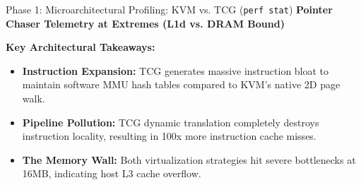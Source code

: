 \documentclass[aspectratio=169]{beamer} %
\begin{document}
    \begin{frame}{Phase 1: Microarchitectural Profiling: KVM vs. TCG (\texttt{perf stat})}
      \textbf{Pointer Chaser Telemetry at Extremes (L1d vs. DRAM Bound)}
      \vspace{0.2cm}
      
      \begin{table}[]
          \centering
          \renewcommand{\arraystretch}{1.3} %
      \end{table}

      \vspace{0.3cm}
      \textbf{Key Architectural Takeaways:}
      \begin{itemize}
          \item \textbf{Instruction Expansion:} TCG generates massive instruction bloat to maintain software MMU hash tables compared to KVM's native 2D page walk.
          \item \textbf{Pipeline Pollution:} TCG dynamic translation completely destroys instruction locality, resulting in 100x more instruction cache misses.
          \item \textbf{The Memory Wall:} Both virtualization strategies hit severe bottlenecks at 16MB, indicating host L3 cache overflow.
      \end{itemize}
    \end{frame}
\end{document}
